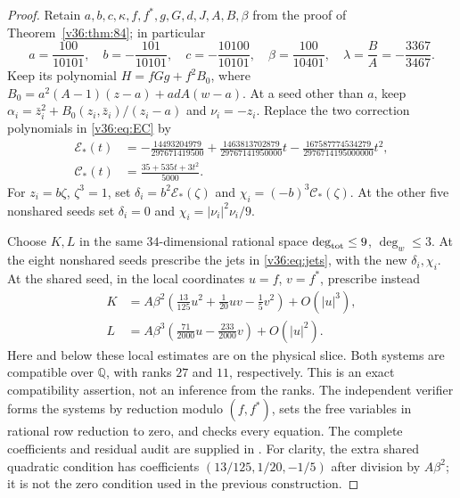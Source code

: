 \documentclass[UTF8,11pt]{ctexart}
\theoremstyle{definition}
\numberwithin{equation}{section}
\begin{document}
\begin{proof}
Retain $a,b,c,\kappa,f,f^*,g,G,d,J,A,B,\beta$ from the proof of
Theorem~\ref{v36:thm:84}; in particular
\[
 a=\frac{100}{10101},\quad b=-\frac{101}{10101},\quad
 c=-\frac{10100}{10101},\quad
 \beta=\frac{100}{10401},\quad \lambda=\frac BA=-\frac{3367}{3467}.
\]
Keep its polynomial $H=fGg+f^2B_0$, where
$B_0=a^2(A-1)(z-a)+adA(w-a)$.
At a seed other than $a$, keep
$\alpha_i=\bar z_i^2+B_0(z_i,\bar z_i)/(z_i-a)$ and $\nu_i=-z_i$.
Replace the two correction polynomials in
\eqref{v36:eq:EC} by
\begin{align*}
 \mathcal E_*(t)
 &=-\frac{14493204979}{297671419500}
   +\frac{1463813702879}{29767141950000}t
   -\frac{167587774534279}{2976714195000000}t^2,\\
 \mathcal C_*(t)&=\frac{35+535t+3t^2}{5000}.
\end{align*}
For $z_i=b\zeta$, $\zeta^3=1$, set
$\delta_i=b^2\mathcal E_*(\zeta)$ and
$\chi_i=(-b)^3\mathcal C_*(\zeta)$.
At the other five nonshared seeds set $\delta_i=0$ and
$\chi_i=|\nu_i|^2\nu_i/9$.

Choose $K,L$ in the same $34$-dimensional rational space
$\deg_{\rm tot}\le9$, $\deg_w\le3$. At the eight nonshared
seeds prescribe the jets in \eqref{v36:eq:jets}, with the new
$\delta_i,\chi_i$. At the shared seed, in the local coordinates
$u=f$, $v=f^*$, prescribe instead
\begin{align}
 K&=A\beta^2\left(\frac{13}{125}u^2+
                \frac1{20}uv-\frac15v^2\right)+O(|u|^3),
                                                    \label{v38:eq:Kjet}\\
 L&=A\beta^3\left(\frac{71}{2000}u-
                       \frac{233}{2000}v\right)+O(|u|^2).
                                                    \label{v38:eq:Ljet}
\end{align}
Here and below these local estimates are on the physical slice.
Both systems are compatible over $\mathbb Q$, with ranks $27$
and $11$, respectively. This is an exact compatibility assertion,
not an inference from the ranks. The independent verifier
 forms the systems by reduction
modulo $(f,f^*)$, sets the free variables in rational row
reduction to zero, and checks every equation. The complete
coefficients and residual audit are supplied in
.
For clarity, the extra shared quadratic condition has coefficients
$(13/125,1/20,-1/5)$ after division by $A\beta^2$; it is not
the zero condition used in the previous construction.


\end{proof}
\end{document}
